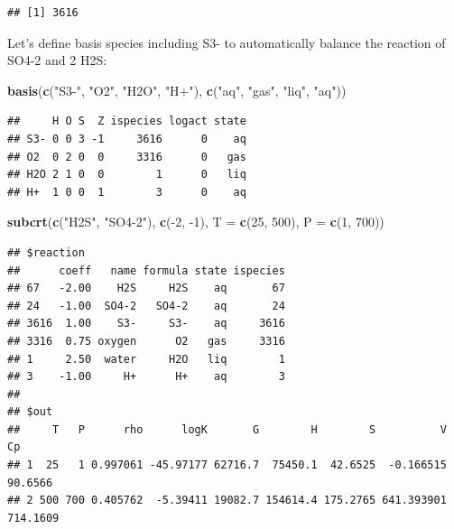 \documentclass[]{tufte-book}
\newenvironment{Shaded}{}{}
\newcommand{\KeywordTok}[1]{\textcolor[rgb]{0.00,0.44,0.13}{\textbf{#1}}}
\newcommand{\DataTypeTok}[1]{\textcolor[rgb]{0.56,0.13,0.00}{#1}}
\newcommand{\DecValTok}[1]{\textcolor[rgb]{0.25,0.63,0.44}{#1}}
\newcommand{\StringTok}[1]{\textcolor[rgb]{0.25,0.44,0.63}{#1}}
\newcommand{\OperatorTok}[1]{\textcolor[rgb]{0.40,0.40,0.40}{#1}}
\newcommand{\NormalTok}[1]{#1}
\begin{document}
\begin{verbatim}
## [1] 3616
\end{verbatim}

Let's define basis species including S3- to automatically balance the
reaction of SO4-2 and 2 H2S:

\begin{Shaded}
\begin{Highlighting}[]
\KeywordTok{basis}\NormalTok{(}\KeywordTok{c}\NormalTok{(}\StringTok{"S3-"}\NormalTok{, }\StringTok{"O2"}\NormalTok{, }\StringTok{"H2O"}\NormalTok{, }\StringTok{"H+"}\NormalTok{), }\KeywordTok{c}\NormalTok{(}\StringTok{"aq"}\NormalTok{, }\StringTok{"gas"}\NormalTok{, }\StringTok{"liq"}\NormalTok{, }\StringTok{"aq"}\NormalTok{))}
\end{Highlighting}
\end{Shaded}

\begin{verbatim}
##     H O S  Z ispecies logact state
## S3- 0 0 3 -1     3616      0    aq
## O2  0 2 0  0     3316      0   gas
## H2O 2 1 0  0        1      0   liq
## H+  1 0 0  1        3      0    aq
\end{verbatim}

\begin{Shaded}
\begin{Highlighting}[]
\KeywordTok{subcrt}\NormalTok{(}\KeywordTok{c}\NormalTok{(}\StringTok{"H2S"}\NormalTok{, }\StringTok{"SO4-2"}\NormalTok{), }\KeywordTok{c}\NormalTok{(}\OperatorTok{-}\DecValTok{2}\NormalTok{, }\OperatorTok{-}\DecValTok{1}\NormalTok{), }\DataTypeTok{T =} \KeywordTok{c}\NormalTok{(}\DecValTok{25}\NormalTok{, }\DecValTok{500}\NormalTok{), }\DataTypeTok{P =} \KeywordTok{c}\NormalTok{(}\DecValTok{1}\NormalTok{, }\DecValTok{700}\NormalTok{))}
\end{Highlighting}
\end{Shaded}

\begin{verbatim}
## $reaction
##      coeff   name formula state ispecies
## 67   -2.00    H2S     H2S    aq       67
## 24   -1.00  SO4-2   SO4-2    aq       24
## 3616  1.00    S3-     S3-    aq     3616
## 3316  0.75 oxygen      O2   gas     3316
## 1     2.50  water     H2O   liq        1
## 3    -1.00     H+      H+    aq        3
## 
## $out
##     T   P      rho      logK       G        H        S          V       Cp
## 1  25   1 0.997061 -45.97177 62716.7  75450.1  42.6525  -0.166515  90.6566
## 2 500 700 0.405762  -5.39411 19082.7 154614.4 175.2765 641.393901 714.1609
\end{verbatim}
\end{document}
